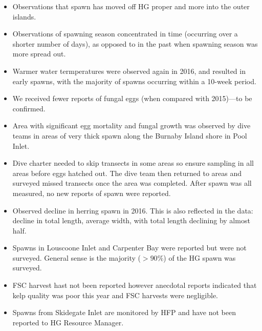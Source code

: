 \begin{itemize}
\item Observations that spawn has moved off HG proper and more into the outer islands.
\item Observations of spawning season concentrated in time (occurring over a shorter number of days), as opposed to in the past when spawning season was more spread out.
\item Warmer water termperatures were observed again in 2016, and resulted in early spawns, with the majority of spawns occurring within a 10-week period.
\item We received fewer reports of fungal eggs (when compared with 2015)---to be confirmed.
\item Area with significant egg mortality and fungal growth was observed by dive teams in areas of very thick spawn along the Burnaby Island shore in Pool Inlet.
\item Dive charter needed to skip transects in some areas so ensure sampling in all areas before eggs hatched out.
The dive team then returned to areas and surveyed missed transects once the area was completed.
After spawn was all measured, no new reports of spawn were reported.
\item Observed decline in herring spawn in 2016.
This is also reflected in the data: decline in total length, average width, with total length declining by almost half.
\item Spawns in Louscoone Inlet and Carpenter Bay were reported but were not surveyed.
General sense is the majority ($>90\%$) of  the HG spawn was surveyed.
\item FSC harvest hast not been reported however anecdotal reports indicated that kelp quality was poor this year and FSC harvests were negligible.
\item Spawns from Skidegate Inlet are monitored by HFP and have not been reported to HG Resource Manager.
\end{itemize}